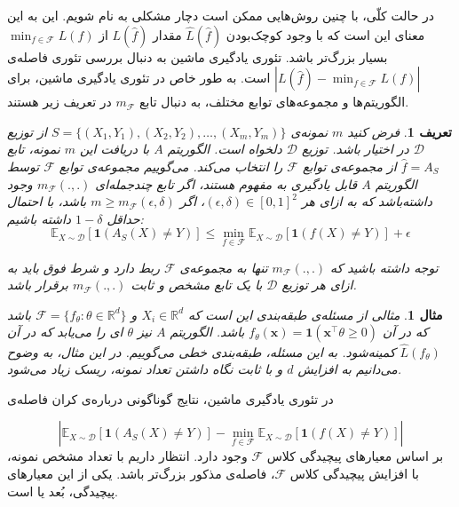 \documentclass[a4paper,12pt]{article}
\newtheorem{den}{{\large\bf تعریف}}[section]
\newtheorem{exa}{{\large\bf مثال}}[section]
\newcommand{\E}{\mathbb{E}}
\newcommand{\R}{\mathbb{R}}
\begin{document}
در حالت کلّی، با چنین روش‌هایی ممکن است دچار مشکلی به نام 
شویم. این به این معنای این است که با وجود کوچک‌بودن
$\hat{L}(\hat{f})$
مقدار 
$L(\hat{f})$
از 
$\min_{f \in \mathcal{F}} L(f)$
بسیار بزرگ‌تر باشد. تئوری یادگیری ماشین به دنبال بررسی تئوری فاصله‌ی 
$|L(\hat{f}) - \min_{f \in \mathcal{F}} L(f)|$
است. به طور خاص در تئوری یادگیری ماشین، برای الگوریتم‌ها و مجموعه‌های توابع مختلف، به دنبال تابع 
$m_\mathcal{F}$
در تعریف زیر هستند.

\begin{den}
	فرض کنید $m$ نمونه‌ی 
	$S = \{(X_1, Y_1), (X_2, Y_2), \dots, (X_m, Y_m)\}$
	از توزیع 
	$\mathcal{D}$
	در اختیار باشد. توزیع 
	$\mathcal{D}$
	دلخواه است.  الگوریتم 
	$A$ 
	با دریافت این 
	$m$
	نمونه، تابع 
	$\hat{f} = A_S$
	از مجموعه‌ی توابع
	$\mathcal{F}$
	را انتخاب می‌کند. می‌گوییم مجموعه‌ی توابع 
	$\mathcal{F}$
	توسط الگوریتم
	$A$
	قابل یادگیری به مفهوم 
	هستند، اگر تابع چند‌جمله‌ای
	$m_\mathcal{F}(., .)$
	وجود داشته‌باشد که به ازای هر 
	$(\epsilon, \delta) \in [0, 1]^2$،
	اگر 
	$m \geq m_\mathcal{F}(\epsilon , \delta)$
	باشد،  با احتمال حداقل 
	$1 - \delta$
	داشته باشیم:
	\begin{equation}
	\E_{X \sim \mathcal{D}} \left[\mathbf{1}(A_S(X) \neq Y) \right]\leq \min_{f \in \mathcal{F}}{\E_{X \sim \mathcal{D}} \left[\mathbf{1}(f(X) \neq Y)\right]} + \epsilon
	\end{equation}
	
	توجه داشته باشید که 
	$m_\mathcal{F}(., .)$
	تنها به مجموعه‌ی 
	$\mathcal{F}$
	ربط دارد و شرط فوق باید به ازای هر توزیع 
	$\mathcal{D}$
	با یک تابع مشخص و ثابت
	$m_\mathcal{F}(., .)$
	برقرار باشد.
	
\end{den}

\begin{exa}
	مثالی از مسئله‌ی طبقه‌بندی این است که 
	$X_i \in \R^d$
	و 
	$\mathcal{F} = \{f_\theta: \theta \in \R^d\}$
	باشد که در آن
	$f_\theta(\mathbf x ) = \mathbf{1}(\mathbf x^\top \theta \geq 0)$
	باشد. الگوریتم $A$ نیز 
	$\theta$
	ای را می‌یابد که در آن 
	$\hat{L}({f_\theta})$
	کمینه‌شود. به این مسئله‌، طبقه‌بندی خطی می‌گوییم. در این مثال، به وضوح می‌دانیم به افزایش 
	$d$
	و با ثابت نگاه داشتن تعداد نمونه‌، ریسک 
	زیاد می‌شود.
\end{exa}

در تئوری یادگیری ماشین، نتایج گوناگونی درباره‌ی کران فاصله‌ی 

$$\left|\E_{X \sim \mathcal{D}} \left[\mathbf{1}(A_S(X) \neq Y)\right] - \min_{f \in \mathcal{F}}{\E_{X \sim \mathcal{D}} \left[\mathbf{1}(f(X) \neq Y)\right]} ‌\right|$$
بر اساس معیار‌های پیچیدگی کلاس 
$\mathcal{F}$
وجود دارد. انتظار داریم با تعداد مشخص نمونه، با افزایش پیچیدگی کلاس 
$\mathcal{F}$،
فاصله‌ی مذکور بزرگ‌تر باشد. یکی از این معیار‌های پیچیدگی، بُعد 
یا 
است.
\end{document}
